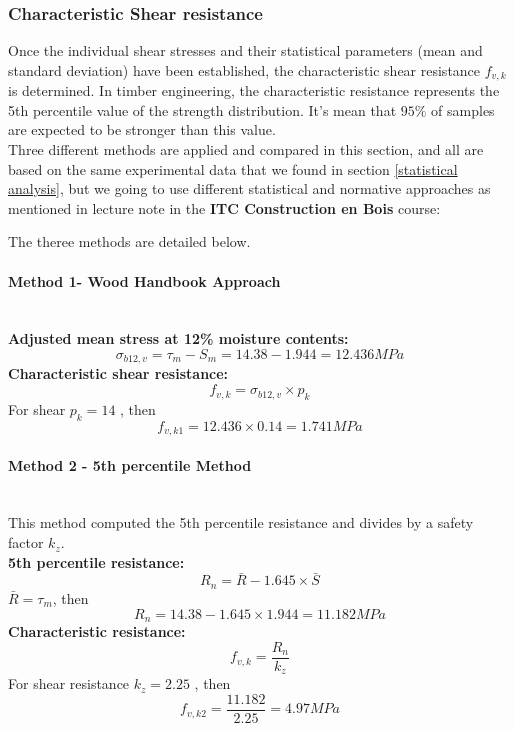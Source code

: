 \subsubsection{Characteristic Shear resistance}
\noindent Once the individual shear stresses and their statistical parameters (mean and standard deviation) have been established, the characteristic shear resistance $f_{v,k}$ is determined. In timber engineering, the characteristic resistance represents the 5th percentile value of the strength distribution. It's mean that $95\%$ of samples are expected to be stronger than this value. \\[4mm]
\noindent Three different methods are applied and compared in this section, and all are based on the same experimental data that we found in section \ref{statistical analysis}, but we going to use different statistical and normative approaches as mentioned in lecture note in the \textbf{ITC Construction en Bois} course:

\begin{table}[H]
\centering
{}
\end{table}
\noindent The theree methods are detailed below.
\paragraph{Method 1- Wood Handbook Approach} \text{ } \\[4mm]
\textbf{Adjusted mean stress at 12\% moisture contents:}
\[\sigma_{b12,v} = \tau_m - S_m = 14.38 - 1.944 = 12.436 MPa\]
\textbf{Characteristic shear resistance:}
\[f_{v,k} = \sigma_{b12,v} \times p_k\]
For shear $p_k = 14$ , then \[f_{v,k1} = 12.436 \times 0.14 = \boxed{1.741 MPa}\]
\paragraph{Method 2 - 5th percentile Method} \text{ } \\[2mm]
This method computed the 5th percentile resistance and divides by a safety factor $k_z$. \\[4mm]
\textbf{5th percentile resistance:}
\[R_n = \bar{R} - 1.645 \times \bar{S} \]
$\bar{R} = \tau_m $, then
\[R_n = 14.38 - 1.645 \times 1.944 = 11.182 MPa\]
\textbf{Characteristic resistance:}
\[f_{v,k} = \dfrac{R_n}{k_z}\]
For shear resistance $k_z = 2.25 $ , then
\[f_{v,k2}= \dfrac{11.182}{2.25} = \boxed{4.97 MPa}\]
